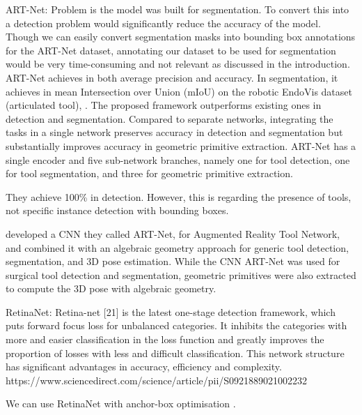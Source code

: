 ART-Net: Problem is the model was built for segmentation. To convert this into a detection problem would significantly reduce the accuracy of the model. Though we can easily convert segmentation masks into bounding box annotations for the ART-Net dataset, annotating our dataset to be used for segmentation would be very time-consuming and not relevant as discussed in the introduction.
ART-Net achieves in both average precision and accuracy. In segmentation, it achieves in mean Intersection over Union (mIoU) on the robotic EndoVis dataset (articulated tool), \cite{hasan_detection_2021}. The proposed framework outperforms existing ones in detection and segmentation. Compared to separate networks, integrating the tasks in a single network preserves accuracy in detection and segmentation but substantially improves accuracy in geometric primitive extraction. 
ART-Net has a single encoder and five sub-network branches, namely one for tool detection, one for tool segmentation, and three for geometric primitive extraction.

They achieve 100\% in detection. However, this is regarding the presence of tools, not specific instance detection with bounding boxes.

developed a CNN they called ART-Net, for Augmented Reality Tool Network, and combined it with an algebraic geometry approach for generic tool detection, segmentation, and 3D pose estimation. While the CNN ART-Net was used for surgical tool detection and segmentation, geometric primitives were also extracted to compute the 3D pose with algebraic geometry.


RetinaNet: Retina-net [21] is the latest one-stage detection framework, which puts forward focus loss for unbalanced categories. It inhibits the categories with more and easier classification in the loss function and greatly improves the proportion of losses with less and difficult classification. This network structure has significant advantages in accuracy, efficiency and complexity. https://www.sciencedirect.com/science/article/pii/S0921889021002232

We can use RetinaNet with anchor-box optimisation \cite{zlocha2019improving}.


